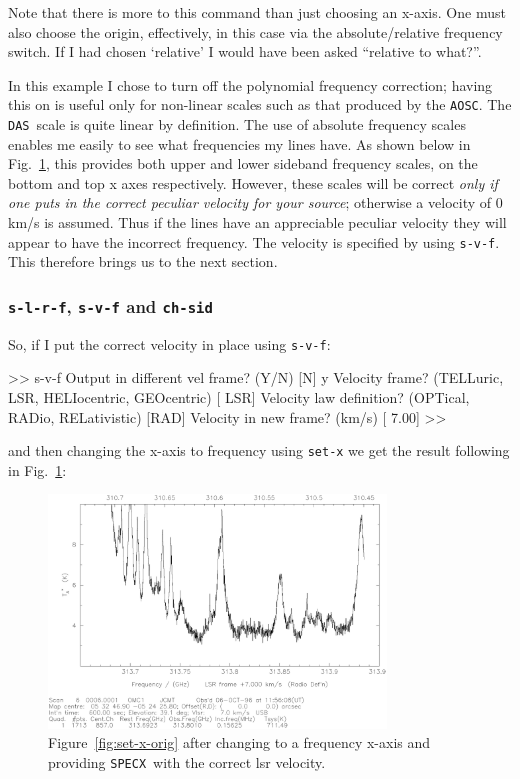 \documentclass[11pt,twoside]{starlink}
\providecommand{\SPECX}{\texttt{SPECX}}
\providecommand{\das}{\texttt{DAS}}
\providecommand{\aosc}{\texttt{AOSC}}
\begin{document}
Note that there is more to this command than just choosing an
x-axis. One must also choose the origin, effectively, in this case via
the absolute/relative frequency switch. If I had chosen `relative' I
would have been asked ``relative to what?''.

In this example I chose to turn off the polynomial frequency
correction; having this on is useful only for non-linear scales such as
that produced
by the \aosc . The \das\ scale is quite linear by definition. The use
of absolute frequency scales enables me easily to see what frequencies
my lines have. As shown below in Fig.~\ref{fig:set-x-to-freq},
this provides both upper and lower
sideband frequency scales, on the bottom and top x axes
respectively. However, these scales will be correct \textit{only if one
puts in the correct peculiar velocity for your source}; otherwise a
velocity of 0 km/s is assumed. Thus if the lines have an appreciable
peculiar velocity they will appear to have the incorrect
frequency. The velocity is specified by using \texttt{s-v-f}. This
therefore brings us to the next section.

\subsubsection{\texttt{s-l-r-f}, \texttt{s-v-f} and \texttt{ch-sid}}
\label{sec:s-l-r-f}
So, if I put the correct velocity in place using \texttt{s-v-f}:
\begin{terminalv}
 >> s-v-f
 Output in different vel frame? (Y/N) [N] y
 Velocity frame? (TELLuric, LSR, HELIocentric, GEOcentric) [ LSR]
 Velocity law definition? (OPTical, RADio, RELativistic) [RAD]
 Velocity in new frame? (km/s) [  7.00]
 >>
\end{terminalv}
and then changing the x-axis to frequency using \texttt{set-x} we get the
result following in Fig.~\ref{fig:set-x-to-freq}:

\begin{figure}[ht]
\includegraphics[width=0.8\textwidth]{sc8_hdo_freq}
\centering
\caption[A messy spectrum with reasonable axes]
{\small{Figure~\ref{fig:set-x-orig} after changing to a frequency
x-axis and providing \SPECX\ with the correct lsr velocity.
}}
\label{fig:set-x-to-freq}
\end{figure}
\end{document}
